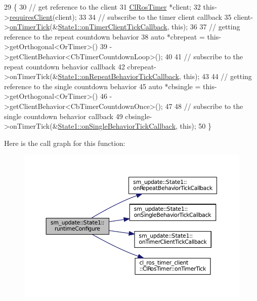 \begin{DoxyCode}
29     \{
30         \textcolor{comment}{// get reference to the client}
31         \hyperlink{classcl__ros__timer__client_1_1ClRosTimer}{ClRosTimer} *client;
32         this->\hyperlink{classsmacc_1_1ISmaccState_a7f95c9f0a6ea2d6f18d1aec0519de4ac}{requiresClient}(client);
33 
34         \textcolor{comment}{// subscribe to the timer client callback}
35         client->\hyperlink{classcl__ros__timer__client_1_1ClRosTimer_ac2d4e684325731df4dc4fc5b7b8a9dbd}{onTimerTick}(&\hyperlink{structsm__update_1_1State1_ab4f7a38bc5323775b20ba5e8cc815a18}{State1::onTimerClientTickCallback},
       \textcolor{keyword}{this});
36 
37         \textcolor{comment}{// getting reference to the repeat countdown behavior}
38         \textcolor{keyword}{auto} *cbrepeat = this->getOrthogonal<OrTimer>()
39                              ->getClientBehavior<CbTimerCountdownLoop>();
40 
41         \textcolor{comment}{// subscribe to the repeat countdown behavior callback}
42         cbrepeat->onTimerTick(&\hyperlink{structsm__update_1_1State1_ada025d5bb975eccc8fc7850bbb90f5dc}{State1::onRepeatBehaviorTickCallback}, \textcolor{keyword}{
      this});
43 
44         \textcolor{comment}{// getting reference to the single countdown behavior}
45         \textcolor{keyword}{auto} *cbsingle = this->getOrthogonal<OrTimer>()
46                              ->getClientBehavior<CbTimerCountdownOnce>();
47 
48         \textcolor{comment}{// subscribe to the single countdown behavior callback}
49         cbsingle->onTimerTick(&\hyperlink{structsm__update_1_1State1_a88f30ef150b79e26b3c93a50a8dc1fa1}{State1::onSingleBehaviorTickCallback}, \textcolor{keyword}{
      this});
50     \}
\end{DoxyCode}


Here is the call graph for this function\+:
\nopagebreak
\begin{figure}[H]
\begin{center}
\leavevmode
\includegraphics[width=350pt]{structsm__update_1_1State1_ab41d1931619e35f24f6c7b6e6e6d0316_cgraph}
\end{center}
\end{figure}


